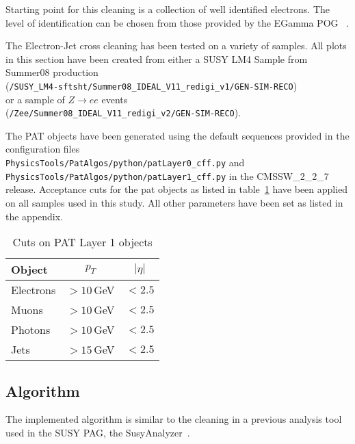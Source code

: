 \documentclass{cmspaper}
\begin{document}
Starting point for this cleaning is a collection of well identified electrons.
The level of identification can be chosen from those provided by the EGamma POG
~\cite{elecID}.

The Electron-Jet cross cleaning has been tested on a variety of samples. All
plots in this section have been created from either a SUSY LM4 Sample from
Summer08 production\\
(\texttt{/SUSY\_LM4-sftsht/Summer08\_IDEAL\_V11\_redigi\_v1/GEN-SIM-RECO})\\
or a sample of
$Z\rightarrow ee$ events \\(\texttt{/Zee/Summer08\_IDEAL\_V11\_redigi\_v2/GEN-SIM-RECO}).

The PAT objects have been generated using the default sequences provided in the
configuration files\\
\texttt{PhysicsTools/PatAlgos/python/patLayer0\_cff.py} and\\
\texttt{PhysicsTools/PatAlgos/python/patLayer1\_cff.py} in the CMSSW\_2\_2\_7
release. Acceptance cuts for the pat objects as listed in
table~\ref{tab:PATobjCuts} have been applied on all samples used in this study.
All other parameters have been set as listed in the appendix.

\begin{table}[h]
\caption{Cuts on PAT Layer 1 objects}
\begin{center}
\begin{tabular}{l|c|c}
\textbf{Object} & \textbf{$p_T$} & \textbf{$|\eta|$} \\ \hline
    Electrons & $>10$\,GeV & $<2.5$  \\\hline
    Muons     & $>10$\,GeV & $<2.5$  \\\hline
    Photons   & $>10$\,GeV & $<2.5$  \\\hline
    Jets      & $>15$\,GeV & $<2.5$
\end{tabular}
\end{center}
\label{tab:PATobjCuts}
\end{table}

\subsection{Algorithm}
The implemented algorithm is similar to the cleaning in a previous analysis
tool used in the SUSY PAG, the SusyAnalyzer~\cite{SusyAnalyzer}.
\end{document}
